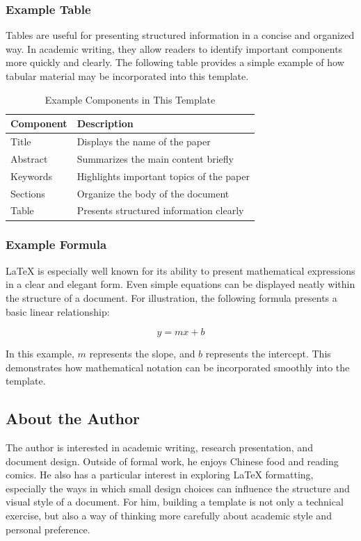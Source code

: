 \documentclass[11pt]{article}
\begin{document}
\subsubsection{Example Table}

Tables are useful for presenting structured information in a concise and organized way. In academic writing, they allow readers to identify important components more quickly and clearly. The following table provides a simple example of how tabular material may be incorporated into this template.

\begin{table}[h]
\centering
\caption{Example Components in This Template}
\begin{tabular}{ll}
\hline
Component & Description \\
\hline
Title & Displays the name of the paper \\
Abstract & Summarizes the main content briefly \\
Keywords & Highlights important topics of the paper \\
Sections & Organize the body of the document \\
Table & Presents structured information clearly \\
\hline
\end{tabular}
\end{table}

\subsubsection{Example Formula}

LaTeX is especially well known for its ability to present mathematical expressions in a clear and elegant form. Even simple equations can be displayed neatly within the structure of a document. For illustration, the following formula presents a basic linear relationship:

\begin{equation}
y = mx + b
\end{equation}

In this example, \(m\) represents the slope, and \(b\) represents the intercept. This demonstrates how mathematical notation can be incorporated smoothly into the template.

\subsection{About the Author}

The author is interested in academic writing, research presentation, and document design. Outside of formal work, he enjoys Chinese food and reading comics. He also has a particular interest in exploring LaTeX formatting, especially the ways in which small design choices can influence the structure and visual style of a document. For him, building a template is not only a technical exercise, but also a way of thinking more carefully about academic style and personal preference.
\end{document}
